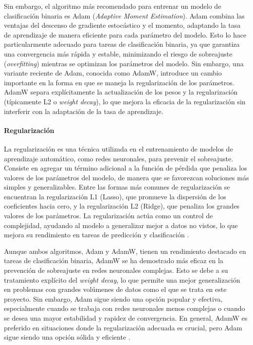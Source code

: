 Sin embargo, el algoritmo más recomendado para entrenar un modelo de clasificación binaria es Adam (\textit{Adaptive Moment Estimation}). Adam combina las ventajas del descenso de gradiente estocástico y el momento, adaptando la tasa de aprendizaje de manera eficiente para cada parámetro del modelo. Esto lo hace particularmente adecuado para tareas de clasificación binaria, ya que garantiza una convergencia más rápida y estable, minimizando el riesgo de sobreajuste (\textit{overfitting}) mientras se optimizan los parámetros del modelo. Sin embargo, una variante reciente de Adam, conocida como AdamW, introduce un cambio importante en la forma en que se maneja la regularización de los parámetros. AdamW separa explícitamente la actualización de los pesos y la regularización (típicamente L2 o \textit{weight decay}), lo que mejora la eficacia de la regularización sin interferir con la adaptación de la tasa de aprendizaje.

\paragraph{Regularización}
La regularización es una técnica utilizada en el entrenamiento de modelos de aprendizaje automático, como redes neuronales, para prevenir el sobreajuste. Consiste en agregar un término adicional a la función de pérdida que penaliza los valores de los parámetros del modelo, de manera que se favorezcan soluciones más simples y generalizables. Entre las formas más comunes de regularización se encuentran la regularización L1 (Lasso), que promueve la dispersión de los coeficientes hacia cero, y la regularización L2 (Ridge), que penaliza los grandes valores de los parámetros. La regularización actúa como un control de complejidad, ayudando al modelo a generalizar mejor a datos no vistos, lo que mejora su rendimiento en tareas de predicción y clasificación \cite{bishop2006pattern}.

Aunque ambos algoritmos, Adam y AdamW, tienen un rendimiento destacado en tareas de clasificación binaria, AdamW se ha demostrado más eficaz en la prevención de sobreajuste en redes neuronales complejas. Esto se debe a su tratamiento explícito del \textit{weight decay}, lo que permite una mejor generalización en problemas con grandes volúmenes de datos como el que se trata en este proyecto. Sin embargo, Adam sigue siendo una opción popular y efectiva, especialmente cuando se trabaja con redes neuronales menos complejas o cuando se desea una mayor estabilidad y rapidez de convergencia. En general, AdamW es preferido en situaciones donde la regularización adecuada es crucial, pero Adam sigue siendo una opción sólida y eficiente \cite{kingma2014adam}.


